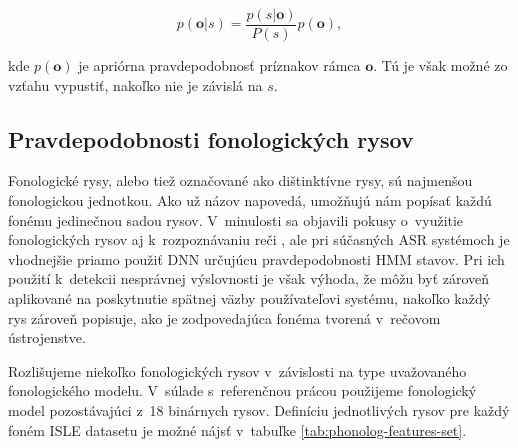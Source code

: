 \begin{equation} \label{eq:prob-to-likelihoods}
    p(\bm{o}|s) = \frac{p(s|\bm{o})}{P(s)} p(\bm{o}),
\end{equation}

\noindent kde $p(\bm{o})$ je apriórna pravdepodobnosť príznakov rámca $\bm{o}$. Tú je však možné zo vzťahu vypustiť, nakoľko nie je závislá na $s$. 

\subsection{Pravdepodobnosti fonologických rysov}

Fonologické rysy, alebo tiež označované ako dištinktívne rysy, sú najmenšou fonologickou jednotkou. Ako už názov napovedá, umožňujú nám popísať každú fonému jedinečnou sadou rysov. V~minulosti sa objavili pokusy o~využitie fonologických rysov aj k~rozpoznávaniu reči \cite{Stouten2006}, ale pri súčasných ASR systémoch je vhodnejšie priamo použiť DNN určujúcu pravdepodobnosti HMM stavov. Pri ich použití k~detekcii nesprávnej výslovnosti je však výhoda, že môžu byť zároveň aplikované na poskytnutie spätnej väzby používateľovi systému, nakoľko každý rys zároveň popisuje, ako je zodpovedajúca fonéma tvorená v~rečovom ústrojenstve.

Rozlišujeme niekoľko fonologických rysov v~závislosti na type uvažovaného fonologického modelu. V~súlade s~referenčnou prácou \cite{Arora2017} použijeme fonologický model pozostávajúci z~18 binárnych rysov. Definíciu jednotlivých rysov pre každý foném ISLE datasetu je možné nájsť v~tabuľke \ref{tab:phonolog-features-set}.

